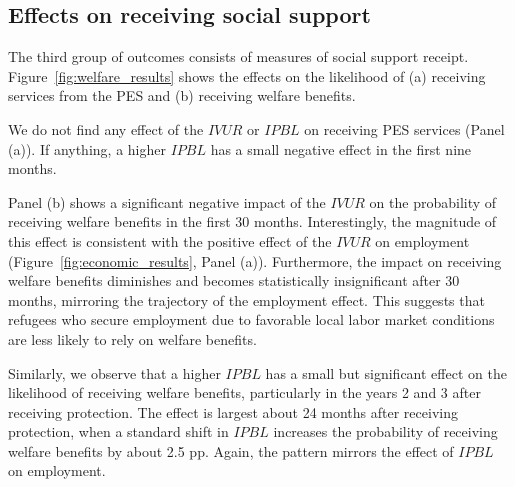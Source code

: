 \FloatBarrier

\subsection{Effects on receiving social support}

The third group of outcomes consists of measures of social support receipt. Figure~\ref{fig:welfare_results} shows the effects on the likelihood of (a) receiving services from the PES and (b) receiving welfare benefits.

We do not find any effect of the $IVUR$ or $IPBL$ on receiving PES services (Panel (a)). If anything, a higher $IPBL$ has a small negative effect in the first nine months.


Panel (b) shows a significant negative impact of the $IVUR$ on the probability of receiving welfare benefits in the first 30 months. Interestingly, the magnitude of this effect is consistent with the positive effect of the $IVUR$ on employment (Figure~\ref{fig:economic_results}, Panel (a)). Furthermore, the impact on receiving welfare benefits diminishes and becomes statistically insignificant after 30 months, mirroring the trajectory of the employment effect. This suggests that refugees who secure employment due to favorable local labor market conditions are less likely to rely on welfare benefits.

Similarly, we observe that a higher $IPBL$ has a small but significant effect on the likelihood of receiving welfare benefits, particularly in the years 2 and 3 after receiving protection. The effect is largest about 24 months after receiving protection, when a standard shift in $IPBL$ increases the probability of receiving welfare benefits by about 2.5 pp. Again, the pattern mirrors the effect of $IPBL$ on employment.


